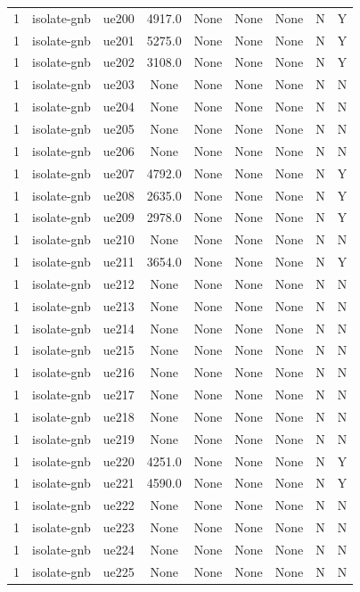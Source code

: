 \begin{table}[ht]
\begin{tabular}{|c|c|c|c|c|c|c|c|c|}
1 & isolate-gnb & ue200 & 4917.0 & None & None & None & N & Y \\
1 & isolate-gnb & ue201 & 5275.0 & None & None & None & N & Y \\
1 & isolate-gnb & ue202 & 3108.0 & None & None & None & N & Y \\
1 & isolate-gnb & ue203 & None & None & None & None & N & N \\
1 & isolate-gnb & ue204 & None & None & None & None & N & N \\
1 & isolate-gnb & ue205 & None & None & None & None & N & N \\
1 & isolate-gnb & ue206 & None & None & None & None & N & N \\
1 & isolate-gnb & ue207 & 4792.0 & None & None & None & N & Y \\
1 & isolate-gnb & ue208 & 2635.0 & None & None & None & N & Y \\
1 & isolate-gnb & ue209 & 2978.0 & None & None & None & N & Y \\
1 & isolate-gnb & ue210 & None & None & None & None & N & N \\
1 & isolate-gnb & ue211 & 3654.0 & None & None & None & N & Y \\
1 & isolate-gnb & ue212 & None & None & None & None & N & N \\
1 & isolate-gnb & ue213 & None & None & None & None & N & N \\
1 & isolate-gnb & ue214 & None & None & None & None & N & N \\
1 & isolate-gnb & ue215 & None & None & None & None & N & N \\
1 & isolate-gnb & ue216 & None & None & None & None & N & N \\
1 & isolate-gnb & ue217 & None & None & None & None & N & N \\
1 & isolate-gnb & ue218 & None & None & None & None & N & N \\
1 & isolate-gnb & ue219 & None & None & None & None & N & N \\
1 & isolate-gnb & ue220 & 4251.0 & None & None & None & N & Y \\
1 & isolate-gnb & ue221 & 4590.0 & None & None & None & N & Y \\
1 & isolate-gnb & ue222 & None & None & None & None & N & N \\
1 & isolate-gnb & ue223 & None & None & None & None & N & N \\
1 & isolate-gnb & ue224 & None & None & None & None & N & N \\
1 & isolate-gnb & ue225 & None & None & None & None & N & N \\

\end{tabular}
\end{table}

